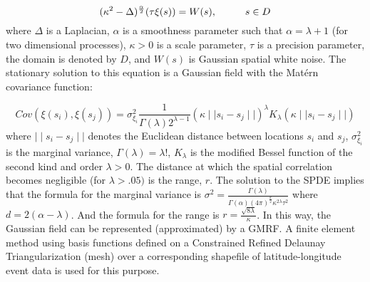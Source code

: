 \documentclass[12pt]{article}
\begin{document}
\begin{equation}
  (\kappa^2 - \Delta)^{\frac{\alpha}{2}}(\tau \xi (s)) = W(s), \hspace*{1cm} s \in D
\end{equation}
\noindent where $\Delta$ is a Laplacian,  $\alpha$ is a smoothness parameter such that
$\alpha = \lambda + 1$ (for two dimensional processes), $\kappa > 0$ is a scale parameter,
$\tau$ is a precision parameter, the domain is denoted by $D$, and $W(s)$ is Gaussian spatial
 white noise. The stationary solution to this equation is a Gaussian field with the
 Mat\'{e}rn covariance function:

\begin{equation}
  Cov(\xi(s_i),\xi(s_j)) = \sigma^2_{\xi_i}\frac{1}{\Gamma(\lambda)2^{\lambda-1}}(\kappa \mid\mid s_i - s_j \mid\mid)^\lambda K_\lambda(\kappa \mid\mid s_i - s_j \mid\mid)
\end{equation}
\noindent where $\mid\mid s_i -s_j\mid\mid$ denotes the Euclidean distance between locations $s_i$ and $s_j$, $\sigma^2_{\xi_i}$ is the marginal variance, $\Gamma(\lambda) = \lambda !$, $K_\lambda$ is the modified Bessel function of the second kind and order $\lambda > 0$. The distance at which the spatial correlation becomes negligible (for $\lambda > .05)$ is the range, $r$. The solution to the SPDE implies that the formula for the marginal variance is $\sigma^2 = \frac{\Gamma(\lambda)}{\Gamma(\alpha)(4\pi)^{\frac{d}{2}}\kappa^{2\lambda}\tau^2}$ where $d=2(\alpha - \lambda)$. And the formula for the range is $r = \frac{\sqrt{8\lambda}}{\kappa}$. In this way, the Gaussian field can be represented (approximated) by a GMRF. A finite element method using basis functions defined on a Constrained Refined Delaunay Triangularization (mesh) over a corresponding shapefile of latitude-longitude event data is used for this purpose.
\end{document}
